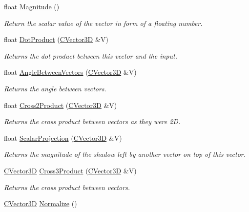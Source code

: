 \begin{DoxyCompactItemize}
\item 
float \hyperlink{struct_c_vector3_d_ac35ff03e99f2cac910225cce8367b8d4}{Magnitude} ()
\begin{DoxyCompactList}\small\item\em Return the scalar value of the vector in form of a floating number. \end{DoxyCompactList}\item 
float \hyperlink{struct_c_vector3_d_a7ee1b485cb4ef925117b3b1fb7c4f941}{Dot\+Product} (\hyperlink{struct_c_vector3_d}{C\+Vector3D} \&V)
\begin{DoxyCompactList}\small\item\em Returns the dot product between this vector and the input. \end{DoxyCompactList}\item 
float \hyperlink{struct_c_vector3_d_a4c0e84128d1849b8614f547e4225cbb6}{Angle\+Between\+Vectors} (\hyperlink{struct_c_vector3_d}{C\+Vector3D} \&V)
\begin{DoxyCompactList}\small\item\em Returns the angle between vectors. \end{DoxyCompactList}\item 
float \hyperlink{struct_c_vector3_d_aa2d7452856a1ecf456c35f06b1f84ffc}{Cross2\+Product} (\hyperlink{struct_c_vector3_d}{C\+Vector3D} \&V)
\begin{DoxyCompactList}\small\item\em Returns the cross product between vectors as they were 2D. \end{DoxyCompactList}\item 
float \hyperlink{struct_c_vector3_d_a9d6df6fe25ece1c98ffb171fb85d9aa8}{Scalar\+Projection} (\hyperlink{struct_c_vector3_d}{C\+Vector3D} \&V)
\begin{DoxyCompactList}\small\item\em Returns the magnitude of the shadow left by another vector on top of this vector. \end{DoxyCompactList}\item 
\hyperlink{struct_c_vector3_d}{C\+Vector3D} \hyperlink{struct_c_vector3_d_a7805983af5b413e7d136f2bc1e55b593}{Cross3\+Product} (\hyperlink{struct_c_vector3_d}{C\+Vector3D} \&V)
\begin{DoxyCompactList}\small\item\em Returns the cross product between vectors. \end{DoxyCompactList}\item 
\hyperlink{struct_c_vector3_d}{C\+Vector3D} \hyperlink{struct_c_vector3_d_a392e9e766f920b9c485ccd35a48be783}{Normalize} ()

\end{DoxyCompactItemize}
